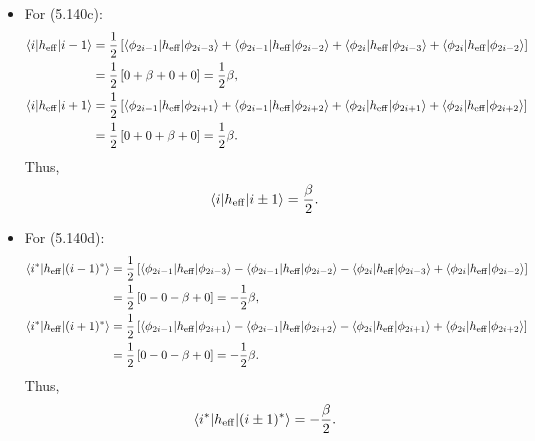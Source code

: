 \documentclass[a4paper]{book}
\newcounter{solution}[chapter]
\newcommand{\heff}{h_{\rm eff}}
\begin{document}
\begin{solution}
\begin{itemize}
	\item For (5.140c):
	\begin{align*}
		\langle i | \heff | i-1 \rangle &= \frac{1}{2} \left[ \langle \phi_{2i-1} | \heff | \phi_{2i-3} \rangle + \langle \phi_{2i-1} | \heff | \phi_{2i-2} \rangle + \langle \phi_{2i} | \heff | \phi_{2i-3} \rangle + \langle \phi_{2i} | \heff | \phi_{2i-2} \rangle \right] \\
		&= \frac{1}{2} \left[ 0 + \beta + 0 + 0 \right] = \frac{1}{2} \beta , \\
		\langle i | \heff | i+1 \rangle &= \frac{1}{2} \left[ \langle \phi_{2i-1} | \heff | \phi_{2i+1} \rangle + \langle \phi_{2i-1} | \heff | \phi_{2i+2} \rangle + \langle \phi_{2i} | \heff | \phi_{2i+1} \rangle + \langle \phi_{2i} | \heff | \phi_{2i+2} \rangle \right] \\
		&= \frac{1}{2} \left[ 0 + 0 + \beta + 0 \right] = \frac{1}{2} \beta .
	\end{align*}
	Thus,
	\[
		\langle i | \heff | i \pm 1 \rangle = \frac{\beta}{2}.
	\]
	
	\item For (5.140d):
	\begin{align*}
		\langle i^* | \heff | (i-1)^* \rangle &= \frac{1}{2} \left[ \langle \phi_{2i-1} | \heff | \phi_{2i-3} \rangle - \langle \phi_{2i-1} | \heff | \phi_{2i-2} \rangle - \langle \phi_{2i} | \heff | \phi_{2i-3} \rangle + \langle \phi_{2i} | \heff | \phi_{2i-2} \rangle \right] \\
		&= \frac{1}{2} \left[ 0 - 0 - \beta + 0 \right] = -\frac{1}{2} \beta , \\
		\langle i^* | \heff | (i+1)^* \rangle &= \frac{1}{2} \left[ \langle \phi_{2i-1} | \heff | \phi_{2i+1} \rangle - \langle \phi_{2i-1} | \heff | \phi_{2i+2} \rangle - \langle \phi_{2i} | \heff | \phi_{2i+1} \rangle + \langle \phi_{2i} | \heff | \phi_{2i+2} \rangle \right] \\
		&= \frac{1}{2} \left[ 0 - 0 - \beta + 0 \right] = -\frac{1}{2} \beta .
	\end{align*}
	Thus,
	\[
		\langle i^* | \heff | (i \pm 1)^* \rangle = -\frac{\beta}{2}.
	\]
	

\end{itemize}
\end{solution}
\end{document}
